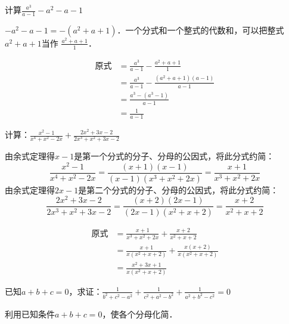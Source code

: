 \begin{example}
    计算$\frac{a^3}{a-1}-a^2-a-1$
\end{example}

\begin{analyze}
    $-a^2-a-1=-(a^2+a+1)$．一个分式和一个整式的代数和，可以把整式$a^2+a+1$当作
    $\frac{a^2+a+1}{1}$．
\end{analyze}

\begin{solution}
    \[\begin{split}
        \text{原式}&=\frac{a^3}{a-1}-\frac{a^2+a+1}{1}   \\
        &=  \frac{a^3}{a-1}-\frac{(a^2+a+1)(a-1)}{a-1}           \\
        &=\frac{a^3-(a^3-1)}{a-1}\\
        &=\frac{1}{a-1}
    \end{split}\]
\end{solution}


\begin{example}
计算：$\frac{x^2-1}{x^4+x^2-2x}+\frac{2x^2+3x-2}{2x^3+x^2+3x-2}$
\end{example}

\begin{analyze}
由余式定理得$x-1$是第一个分式的分子、分母的公因式，将此分式约简：
\[\frac{x^2-1}{x^4+x^2-2x}=\frac{(x+1)(x-1)}{(x-1)(x^3+x^2+2x)}=\frac{x+1}{x^3+x^2+2x}\]
由余式定理得$2x-1$是第二个分式的分子、分母的公因式，将此分式约简：
\[\frac{2x^2+3x-2}{2x^3+x^2+3x-2}=\frac{(x+2)(2x-1)}{(2x-1)(x^2+x+2)}=\frac{x+2}{x^2+x+2}\]
\end{analyze}

\begin{solution}
\[\begin{split}
    \text{原式}&=\frac{x+1}{x^3+x^2+2x}+ \frac{x+2}{x^2+x+2}  \\
    &= \frac{x+1}{x(x^2+x+2)}+ \frac{x(x+2)}{x(x^2+x+2)}   \\
    &=\frac{x^2+3x+1}{x(x^2+x+2)}
\end{split}\] 
\end{solution}

\begin{example}
    已知$a+b+c=0$，求证：$\frac{1}{b^2+c^2-a^2}+\frac{1}{c^2+a^2-b^2}+\frac{1}{a^2+b^2-c^2}=0$
\end{example}

\begin{analyze}
利用已知条件$a+b+c=0$，使各个分母化简．
\end{analyze}

